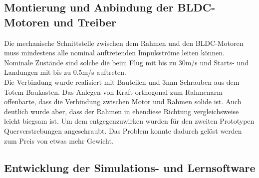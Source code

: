 \subsection{Montierung und Anbindung der BLDC-Motoren und Treiber}
Die mechanische Schnittstelle zwischen dem Rahmen und den BLDC-Motoren muss mindestens alle nominal auftretenden Impulsströme leiten können. Nominale Zustände sind solche die beim Flug mit bis zu 30m/s und Starts- und Landungen mit bis zu 0.5m/s auftreten.\\
Die Verbindung wurde realisiert mit Bauteilen und 3mm-Schrauben aus dem Totem-Baukasten. Das Anlegen von Kraft orthogonal zum Rahmenarm offenbarte, dass die Verbindung zwischen Motor und Rahmen solide ist. Auch deutlich wurde aber, dass der Rahmen in ebendiese Richtung vergleichsweise leicht biegsam ist. Um dem entgegenzuwirken wurden für den zweiten Prototypen Querverstrebungen angeschraubt. Das Problem konnte dadurch gelöst werden zum Preis von etwas mehr Gewicht.

\subsection{\label{software:Software}Entwicklung der Simulations- und Lernsoftware}
